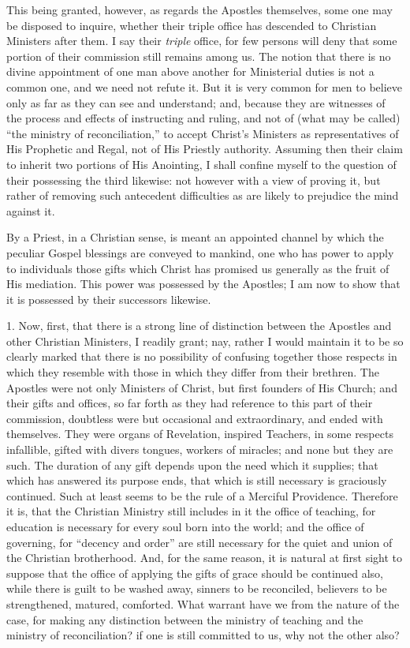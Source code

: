 This being granted, however, as regards the Apostles themselves, some
one may be disposed to inquire, whether their triple office has
descended to Christian Ministers after them. I say their \emph{triple}
office, for few persons will deny that some portion of their commission
still remains among us. The notion that there is no divine appointment
of one man above another for Ministerial duties is not a common one, and
we need not refute it. But it is very common for men to believe only as
far as they can see and understand; and, because they are witnesses of
the process and effects of instructing and ruling, and not of (what may
be called) ``the ministry of reconciliation,'' to accept
Christ's Ministers as representatives of His Prophetic and Regal, not
of His Priestly authority. Assuming then their claim to inherit two
portions of His Anointing, I shall confine myself to the question of
their possessing the third likewise: not however with a view of proving
it, but rather of removing such antecedent difficulties as are likely to
prejudice the mind against it.

By a Priest, in a Christian sense, is meant an appointed channel by
which the peculiar Gospel blessings are conveyed to mankind, one who has
power to apply to individuals those gifts which Christ has promised us
generally as the fruit of His mediation. This power was possessed by the
Apostles; I am now to show that it is possessed by their successors
likewise.

1. Now, first, that there is a strong line of distinction between the
Apostles and other Christian Ministers, I readily grant; nay, rather I
would maintain it to be so clearly marked that there is no possibility
of confusing together those respects in which they resemble with those
in which they differ from their brethren. The Apostles were not only
Ministers of Christ, but first founders of His Church; and their gifts
and offices, so far forth as they had reference to this part of their
commission, doubtless were but occasional and extraordinary, and ended
with themselves. They were organs of Revelation, inspired Teachers, in
some respects infallible, gifted with divers tongues, workers of
miracles; and none but they are such. The duration of any gift depends
upon the need which it supplies; that which has answered its purpose
ends, that which is still necessary is graciously continued. Such at
least seems to be the rule of a Merciful Providence. Therefore it is,
that the Christian Ministry still includes in it the office of teaching,
for education is necessary for every soul born into the world; and the
office of governing, for ``decency and order'' are still
necessary for the quiet and union of the Christian brotherhood. And, for
the same reason, it is natural at first sight to suppose that the office
of applying the gifts of grace should be continued also, while there is
guilt to be washed away, sinners to be reconciled, believers to be
strengthened, matured, comforted. What warrant have we from the nature
of the case, for making any distinction between the ministry of teaching
and the ministry of reconciliation? if one is still committed to us, why
not the other also?

